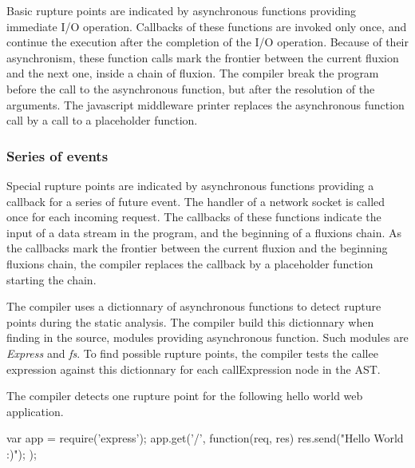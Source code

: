 Basic rupture points are indicated by asynchronous functions providing immediate I/O operation.
Callbacks of these functions are invoked only once, and continue the execution after the completion of the I/O operation.
Because of their asynchronism, these function calls mark the frontier between the current fluxion and the next one, inside a chain of fluxion.
The compiler break the program before the call to the asynchronous function, but after the resolution of the arguments.
The javascript middleware printer replaces the asynchronous function call by a call to a placeholder function.

\subsubsection{Series of events} \label{sss:start}

Special rupture points are indicated by asynchronous functions providing a callback for a series of future event.
The handler of a network socket is called once for each incoming request.
The callbacks of these functions indicate the input of a data stream in the program, and the beginning of a fluxions chain.
As the callbacks mark the frontier between the current fluxion and the beginning fluxions chain, the compiler replaces the callback by a placeholder function starting the chain.

The compiler uses a dictionnary of asynchronous functions to detect rupture points during the static analysis.
The compiler build this dictionnary when finding in the source, modules providing asynchronous function.
Such modules are \textit{Express} and \textit{fs}.
To find possible rupture points, the compiler tests the callee expression against this dictionnary for each callExpression node in the AST.

The compiler detects one rupture point for the following hello world web application. 

\begin{code}[Javascript, caption={Hello World},label={lst:hello}]
var app = require('express');
app.get('/', function(req, res) {
  res.send("Hello World :)");
});
\end{code}

